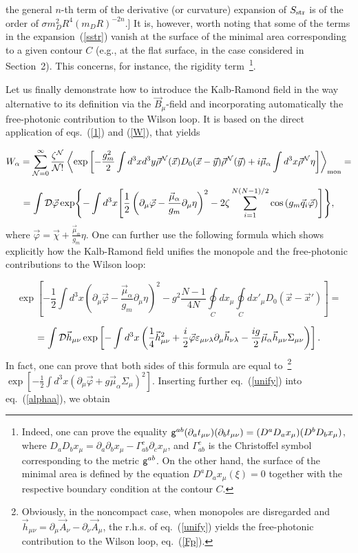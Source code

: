 \documentclass[a4paper,12pt]{article}
\begin{document}
the general $n$-th term of the derivative (or curvature) expansion of $S_{\rm str}$ is of the order of $\sigma m_D^2R^4(m_DR)^{-2n}$.]
It is, however, worth noting that some of the terms in the expansion~(\ref{sstr}) vanish at the surface of the minimal area corresponding to
a given contour $C$ (e.g., at the flat surface, in the case considered in Section~2). This concerns, for instance, the rigidity term~\footnote{
Indeed, one can prove the equality
${\sf g}^{ab}(\partial_at_{\mu\nu})(\partial_bt_{\mu\nu})=(D^aD_ax_\mu)(D^bD_bx_\mu)$, where
$D_aD_bx_\mu=\partial_a\partial_bx_\mu-\Gamma_{ab}^c\partial_cx_\mu$, and $\Gamma_{ab}^c$ is the Christoffel symbol corresponding to
the metric ${\sf g}^{ab}$. On the other hand, the surface of the minimal area is defined by the equation $D^aD_ax_\mu(\xi)=0$ together
with the respective boundary condition at the contour $C$.}.

Let us finally demonstrate how to introduce the Kalb-Ramond field in the way alternative to its definition via the $\vec B_\mu$-field
and incorporating automatically the free-photonic contribution to the Wilson loop. It is based on the
direct application of eqs.~(\ref{1}) and (\ref{W}), that yields

$$
W_\alpha=\sum\limits_{{\cal N}=0}^{\infty}\frac{\zeta^{\cal N}}{{\cal N}!}
\left<\exp\left[-\frac{g_m^2}{2}\int d^3x d^3y\vec\rho^{\cal N}(\vec x)D_0(\vec x-\vec y)
\vec\rho^{\cal N}(\vec y)+i\vec\mu_\alpha\int d^3x\vec\rho^{\cal N}\eta\right]\right>_{\rm mon}=$$

\begin{equation}
\label{alphaa}
=\int {\cal D}\vec\varphi\exp\Biggl\{-\int d^3x\Biggl[\frac12\left(\partial_\mu\vec\varphi-\frac{\vec\mu_\alpha}{g_m}
\partial_\mu\eta\right)^2-2\zeta\sum\limits_{i=1}^{N(N-1)/2}
\cos\left(g_m\vec q_i\vec\varphi\right)\Biggr]\Biggr\},
\end{equation}
where $\vec\varphi=\vec\chi+\frac{\vec\mu_\alpha}{g_m}\eta$. One can further use the following formula which
shows explicitly how the Kalb-Ramond field unifies the monopole and the free-photonic contributions
to the Wilson loop:

$$\exp\left[-\frac12\int d^3x\left(\partial_\mu\vec\varphi-\frac{\vec\mu_\alpha}{g_m}
\partial_\mu\eta\right)^2-g^2\frac{N-1}{4N}
\oint\limits_C^{}dx_\mu\oint\limits_C^{}dx'_\mu
D_0(\vec x-\vec x')\right]=$$

\begin{equation}
\label{unify}
=\int {\cal D}\vec h_{\mu\nu}\exp\left[-\int d^3x\left(
\frac14\vec h_{\mu\nu}^2+\frac{i}{2}\vec\varphi\varepsilon_{\mu\nu\lambda}\partial_\mu
\vec h_{\nu\lambda}-\frac{ig}{2}\vec\mu_\alpha\vec h_{\mu\nu}\Sigma_{\mu\nu}\right)\right].
\end{equation}
In fact, one can prove that both sides of this formula are equal to~\footnote{
Obviously, in the noncompact case, when monopoles are disregarded and $\vec h_{\mu\nu}=\partial_\mu\vec A_\nu-
\partial_\nu\vec A_\mu$, the r.h.s. of eq.~(\ref{unify}) yields the free-photonic contribution to the Wilson loop,
eq.~(\ref{Fp}).} $\exp\left[-\frac12\int d^3x\left(\partial_\mu\vec\varphi+g\vec\mu_\alpha\Sigma_\mu\right)^2\right]$.
Inserting further eq.~(\ref{unify}) into eq.~(\ref{alphaa}), we obtain
\end{document}
